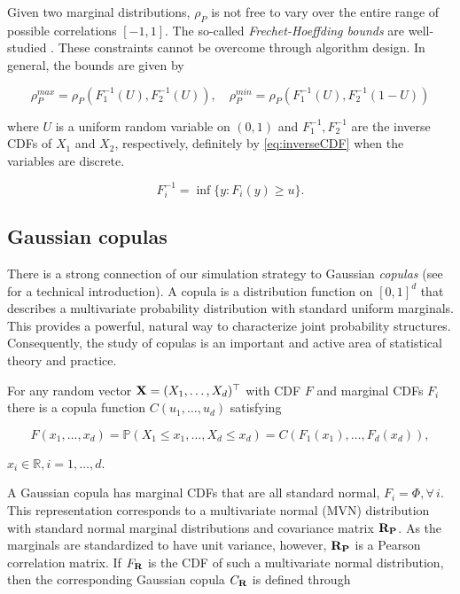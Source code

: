 \documentclass[
]{jss}
\begin{document}
Given two marginal distributions, \(\rho_P\) is not free to vary over the entire range of possible correlations \([-1,1]\). The so-called \emph{Frechet-Hoeffding bounds} are well-studied \citep{Nelsen2007, BF17}. These constraints cannot be overcome through algorithm design. In general, the bounds are given by

\begin{equation}
\label{eq:frechet}
\rho_P^{max} = \rho_P \left( F^{-1}_1 (U), F^{-1}_2 (U) \right), \quad \rho_P^{min} = \rho_P \left( F^{-1}_1 (U), F^{-1}_2 (1 - U) \right)
\end{equation}

\noindent where \(U\) is a uniform random variable on \((0,1)\) and \(F^{-1}_1, F^{-1}_2\) are the inverse CDFs of \(X_1\) and \(X_2\), respectively, definitely by \eqref{eq:inverseCDF} when the variables are discrete.

\begin{equation}
F_{i}^{-1} = \inf\{y:F_{i}(y) \geq u \}.
\label{eq:inverseCDF}
\end{equation}

\hypertarget{gaussian-copulas}{%
\subsection{Gaussian copulas}\label{gaussian-copulas}}

There is a strong connection of our simulation strategy to Gaussian \emph{copulas} (see \citet{Nelsen2007} for a technical introduction). A copula is a distribution function on \([0,1]^d\) that describes a multivariate probability distribution with standard uniform marginals. This provides a powerful, natural way to characterize joint probability structures. Consequently, the study of copulas is an important and active area of statistical theory and practice.

For any random vector \({\bf X}=(X_1, \ldots, X_d)^\top\) with CDF \(F\) and marginal CDFs \(F_i\) there is a copula function \(C(u_1, \ldots, u_d)\) satisfying

\begin{equation}
F(x_1, \ldots, x_d) = {\mathbb P}(X_1\leq x_1, \ldots,X_d\leq x_d) = C(F_1(x_1), \ldots, F_d(x_d)), 
\label{eq:copula}
\end{equation}

\(x_i \in {\mathbb R}, i=1,\ldots,d.\)

A Gaussian copula has marginal CDFs that are all standard normal, \(F_i = \Phi, \forall \, i\). This representation corresponds to a multivariate normal (MVN) distribution with standard normal marginal distributions and covariance matrix \({\bf R_P}\). As the marginals are standardized to have unit variance, however, \({\bf R_P}\) is a Pearson correlation matrix. If \(F_{{\bf R}}\) is the CDF of such a multivariate normal distribution, then the corresponding Gaussian copula \(C_{{\bf R}}\) is defined through
\end{document}
